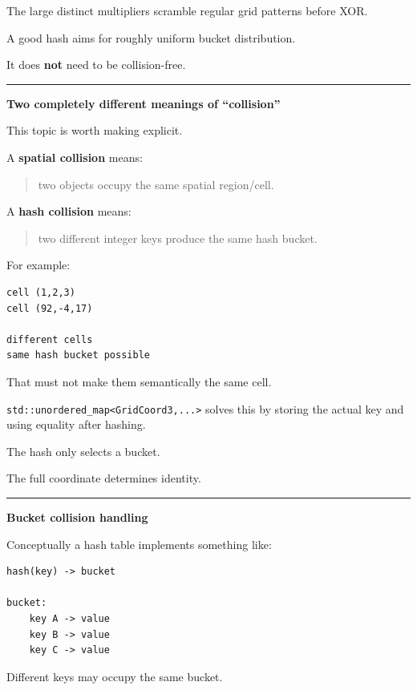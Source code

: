 The large distinct multipliers scramble regular grid patterns before XOR.

A good hash aims for roughly uniform bucket distribution.

It does \textbf{not} need to be collision-free.

\begin{center}\rule{0.5\linewidth}{0.5pt}\end{center}

\textbf{Two completely different meanings of ``collision''}

This topic is worth making explicit.

A \textbf{spatial collision} means:

\begin{quote}
two objects occupy the same spatial region/cell.
\end{quote}

A \textbf{hash collision} means:

\begin{quote}
two different integer keys produce the same hash bucket.
\end{quote}

For example:

\begin{verbatim}
cell (1,2,3)
cell (92,-4,17)

different cells
same hash bucket possible
\end{verbatim}

That must not make them semantically the same cell.

\texttt{std::unordered\_map\textless{}GridCoord3,...\textgreater{}} solves this by storing the actual key and using equality after hashing.

The hash only selects a bucket.

The full coordinate determines identity.

\begin{center}\rule{0.5\linewidth}{0.5pt}\end{center}

\textbf{Bucket collision handling}

Conceptually a hash table implements something like:

\begin{verbatim}
hash(key) -> bucket

bucket:
    key A -> value
    key B -> value
    key C -> value
\end{verbatim}

Different keys may occupy the same bucket.

